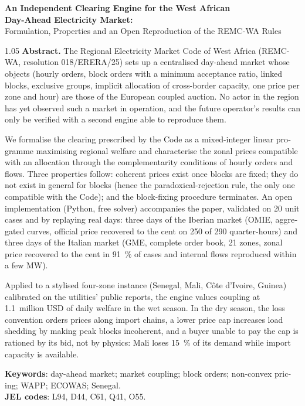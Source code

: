 \documentclass[a4paper,12pt]{article}
\theoremstyle{definition}
\begin{document}
\newpage
\begin{otherlanguage}{english}
\begin{center}
\vspace*{1.5em}
{\large\bfseries An Independent Clearing Engine for the West African\\ Day-Ahead Electricity Market:\\[3pt]}
{\normalsize Formulation, Properties and an Open Reproduction of the REMC-WA Rules}
\end{center}
\vspace{1em}
\begin{center}
\begin{minipage}{0.92\textwidth}
\sloppy
\begin{spacing}{1.05}
\noindent\textbf{Abstract.} The Regional Electricity Market Code of West Africa (REMC-WA, resolution 018/ERERA/25) sets up a centralised day-ahead market whose objects (hourly orders, block orders with a minimum acceptance ratio, linked blocks, exclusive groups, implicit allocation of cross-border capacity, one price per zone and hour) are those of the European coupled auction. No actor in the region has yet observed such a market in operation, and the future operator's results can only be verified with a second engine able to reproduce them.

\medskip
\noindent We formalise the clearing prescribed by the Code as a mixed-integer linear programme maximising regional welfare and characterise the zonal prices compatible with an allocation through the complementarity conditions of hourly orders and flows. Three properties follow: coherent prices exist once blocks are fixed; they do not exist in general for blocks (hence the paradoxical-rejection rule, the only one compatible with the Code); and the block-fixing procedure terminates. An open implementation (Python, free solver) accompanies the paper, validated on 20 unit cases and by replaying real days: three days of the Iberian market (OMIE, aggregated curves, official price recovered to the cent on 250 of 290 quarter-hours) and three days of the Italian market (GME, complete order book, 21 zones, zonal price recovered to the cent in 91~\% of cases and internal flows reproduced within a few MW).

\medskip
\noindent Applied to a stylised four-zone instance (Senegal, Mali, Côte d'Ivoire, Guinea) calibrated on the utilities' public reports, the engine values coupling at 1.1~million USD of daily welfare in the wet season. In the dry season, the loss convention orders prices along import chains, a lower price cap increases load shedding by making peak blocks incoherent, and a buyer unable to pay the cap is rationed by its bid, not by physics: Mali loses 15~\% of its demand while import capacity is available.\par\smallskip
\textbf{Keywords}: day-ahead market; market coupling; block orders; non-convex pricing; WAPP; ECOWAS; Senegal.\\
\textbf{JEL codes}: L94, D44, C61, Q41, O55.
\end{spacing}
\end{minipage}
\end{center}
\end{otherlanguage}
\newpage
\end{document}
